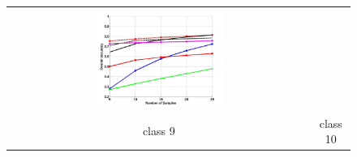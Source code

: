 \begin{figure}[h]
\begin{tabular}{cc}
		\includegraphics[width=0.45\textwidth]{appendix/tables/MNIST_Rate_5_class_10.jpg} \\
		class 9 & class 10\\
	\end{tabular}
\end{figure}